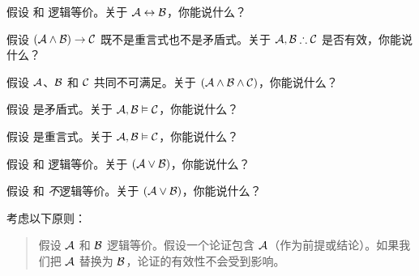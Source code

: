 \begin{compactlist}
\item 假设  和  逻辑等价。关于 $\mathcal{A}\leftrightarrow\mathcal{B}$，你能说什么？
\item 假设 $(\mathcal{A}\wedge\mathcal{B})\rightarrow\mathcal{C}$ 既不是重言式也不是矛盾式。关于 $\metav{A}, \metav{B} \therefore\metav{C}$ 是否有效，你能说什么？
\item 假设 $\mathcal{A}$、$\mathcal{B}$ 和 $\mathcal{C}$ 共同不可满足。关于 $(\mathcal{A}\wedge\mathcal{B}\wedge\mathcal{C})$，你能说什么？
\item 假设  是矛盾式。关于 $\mathcal{A}, \mathcal{B} \vDash \mathcal{C}$，你能说什么？
\item 假设  是重言式。关于 $\mathcal{A}, \mathcal{B}\vDash \mathcal{C}$，你能说什么？
\item 假设  和  逻辑等价。关于 $(\mathcal{A}\vee\mathcal{B})$，你能说什么？
\item 假设  和 \emph{不}逻辑等价。关于 $(\mathcal{A}\vee\mathcal{B})$，你能说什么？
\end{compactlist}


\problempart
考虑以下原则：


\begin{quote}
		假设 $\mathcal{A}$ 和 $\mathcal{B}$ 逻辑等价。假设一个论证包含 $\mathcal{A}$（作为前提或结论）。如果我们把 $\mathcal{A}$ 替换为 $\mathcal{B}$，论证的有效性不会受到影响。
	\end{quote}


